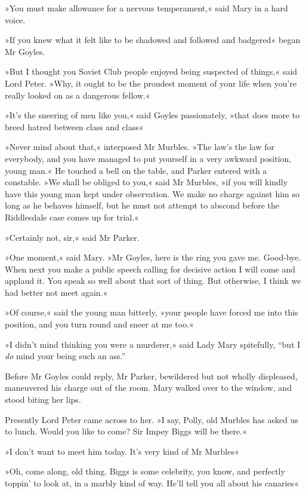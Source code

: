 »You must make allowance for a nervous temperament,« said Mary in a hard voice.

»If you knew what it felt like to be shadowed and followed and badgered\longdash« began Mr Goyles.

»But I thought you Soviet Club people enjoyed being suspected of things,« said Lord Peter. »Why, it ought to be the proudest moment of your life when you're really looked on as a dangerous fellow.«

»It's the sneering of men like you,« said Goyles passionately, »that does more to breed hatred between class and class\longdash«

»Never mind about that,« interposed Mr Murbles. »The law's the law for everybody, and you have managed to put yourself in a very awkward position, young man.« He touched a bell on the table, and Parker entered with a constable. »We shall be obliged to you,« said Mr Murbles, »if you will kindly have this young man kept under observation. We make no charge against him so long as he behaves himself, but he must not attempt to abscond before the Riddlesdale case comes up for trial.«

»Certainly not, sir,« said Mr Parker.

»One moment,« said Mary. »Mr Goyles, here is the ring you gave me.  Good-bye. When next you make a public speech calling for decisive action I will come and applaud it. You speak so well about that sort of thing. But otherwise, I think we had better not meet again.«

»Of course,« said the young man bitterly, »your people have forced me into this position, and you turn round and sneer at me too.«

»I didn't mind thinking you were a murderer,« said Lady Mary spitefully, \enquote{but I \textit{do} mind your being such an ass.}

Before Mr Goyles could reply, Mr Parker, bewildered but not wholly displeased, maneuvered his charge out of the room. Mary walked over to the window, and stood biting her lips.

Presently Lord Peter came across to her. »I say, Polly, old Murbles has asked us to lunch. Would you like to come? Sir Impey Biggs will be there.«

»I don't want to meet him today. It's very kind of Mr Murbles\longdash«

»Oh, come along, old thing. Biggs is some celebrity, you know, and perfectly toppin' to look at, in a marbly kind of way. He'll tell you all about his canaries\longdash«


